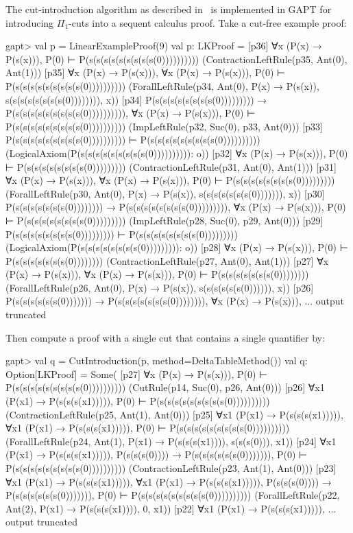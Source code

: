 \documentclass[a4paper,11pt]{book}
\begin{document}
The cut-introduction algorithm as described in~\cite{Hetzl2012,Hetzl14Algorithmic,Hetzl14Introducing} is
implemented in GAPT for introducing $\Pi_1$-cuts into a sequent calculus
proof. Take a cut-free example proof:
\begin{clilisting}
gapt> val p = LinearExampleProof(9)
val p: LKProof = [p36] ∀x (P(x) → P(s(x))), P(0) ⊢ P(s(s(s(s(s(s(s(s(s(0))))))))))    (ContractionLeftRule(p35, Ant(0), Ant(1)))
[p35] ∀x (P(x) → P(s(x))), ∀x (P(x) → P(s(x))), P(0) ⊢ P(s(s(s(s(s(s(s(s(s(0))))))))))    (ForallLeftRule(p34, Ant(0), P(x) → P(s(x)), s(s(s(s(s(s(s(s(0)))))))), x))
[p34] P(s(s(s(s(s(s(s(s(0))))))))) → P(s(s(s(s(s(s(s(s(s(0)))))))))),
∀x (P(x) → P(s(x))),
P(0)
⊢
P(s(s(s(s(s(s(s(s(s(0))))))))))    (ImpLeftRule(p32, Suc(0), p33, Ant(0)))
[p33] P(s(s(s(s(s(s(s(s(s(0)))))))))) ⊢ P(s(s(s(s(s(s(s(s(s(0))))))))))    (LogicalAxiom(P(s(s(s(s(s(s(s(s(s(0)))))))))): o))
[p32] ∀x (P(x) → P(s(x))), P(0) ⊢ P(s(s(s(s(s(s(s(s(0)))))))))    (ContractionLeftRule(p31, Ant(0), Ant(1)))
[p31] ∀x (P(x) → P(s(x))), ∀x (P(x) → P(s(x))), P(0) ⊢ P(s(s(s(s(s(s(s(s(0)))))))))    (ForallLeftRule(p30, Ant(0), P(x) → P(s(x)), s(s(s(s(s(s(s(0))))))), x))
[p30] P(s(s(s(s(s(s(s(0)))))))) → P(s(s(s(s(s(s(s(s(0))))))))),
∀x (P(x) → P(s(x))),
P(0)
⊢
P(s(s(s(s(s(s(s(s(0)))))))))    (ImpLeftRule(p28, Suc(0), p29, Ant(0)))
[p29] P(s(s(s(s(s(s(s(s(0))))))))) ⊢ P(s(s(s(s(s(s(s(s(0)))))))))    (LogicalAxiom(P(s(s(s(s(s(s(s(s(0))))))))): o))
[p28] ∀x (P(x) → P(s(x))), P(0) ⊢ P(s(s(s(s(s(s(s(0))))))))    (ContractionLeftRule(p27, Ant(0), Ant(1)))
[p27] ∀x (P(x) → P(s(x))), ∀x (P(x) → P(s(x))), P(0) ⊢ P(s(s(s(s(s(s(s(0))))))))    (ForallLeftRule(p26, Ant(0), P(x) → P(s(x)), s(s(s(s(s(s(0)))))), x))
[p26] P(s(s(s(s(s(s(0))))))) → P(s(s(s(s(s(s(s(0)))))))),
∀x (P(x) → P(s(x))),
... output truncated

\end{clilisting}
Then compute a proof with a single cut that contains a single quantifier by:
\begin{clilisting}
gapt> val q = CutIntroduction(p, method=DeltaTableMethod())
val q: Option[LKProof] = Some(
  [p27] ∀x (P(x) → P(s(x))), P(0) ⊢ P(s(s(s(s(s(s(s(s(s(0))))))))))    (CutRule(p14, Suc(0), p26, Ant(0)))
[p26] ∀x1 (P(x1) → P(s(s(s(x1))))), P(0) ⊢ P(s(s(s(s(s(s(s(s(s(0))))))))))    (ContractionLeftRule(p25, Ant(1), Ant(0)))
[p25] ∀x1 (P(x1) → P(s(s(s(x1))))),
∀x1 (P(x1) → P(s(s(s(x1))))),
P(0)
⊢
P(s(s(s(s(s(s(s(s(s(0))))))))))    (ForallLeftRule(p24, Ant(1), P(x1) → P(s(s(s(x1)))), s(s(s(0))), x1))
[p24] ∀x1 (P(x1) → P(s(s(s(x1))))),
P(s(s(s(0)))) → P(s(s(s(s(s(s(0))))))),
P(0)
⊢
P(s(s(s(s(s(s(s(s(s(0))))))))))    (ContractionLeftRule(p23, Ant(1), Ant(0)))
[p23] ∀x1 (P(x1) → P(s(s(s(x1))))),
∀x1 (P(x1) → P(s(s(s(x1))))),
P(s(s(s(0)))) → P(s(s(s(s(s(s(0))))))),
P(0)
⊢
P(s(s(s(s(s(s(s(s(s(0))))))))))    (ForallLeftRule(p22, Ant(2), P(x1) → P(s(s(s(x1)))), 0, x1))
[p22] ∀x1 (P(x1) → P(s(s(s(x1))))),
... output truncated

\end{clilisting}
\end{document}
